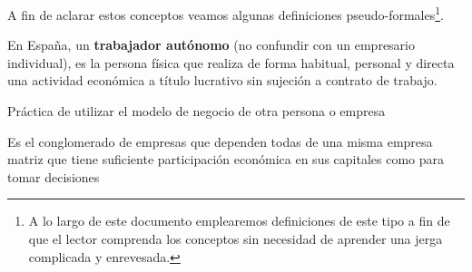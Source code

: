 \documentclass[nochap,palatino,shortheader]{apuntes}
\begin{document}
A fin de aclarar estos conceptos veamos algunas definiciones pseudo-formales\footnote{A lo largo de este documento emplearemos definiciones de este tipo a fin de que el lector comprenda los conceptos sin necesidad de aprender una jerga complicada y enrevesada.}.

\begin{defn}[Autónomo]
En España, un \textbf{trabajador autónomo} (no confundir con un empresario individual), es la persona física que realiza de forma habitual, personal y directa una actividad económica a título lucrativo sin sujeción a contrato de trabajo.
\end{defn}

\begin{defn}[Franquicia]
Práctica de utilizar el modelo de negocio de otra persona o empresa
\end{defn}

\begin{defn}
Es el conglomerado de empresas que dependen todas de una misma empresa matriz que tiene suficiente participación económica en sus capitales como para tomar decisiones
\end{defn}
\end{document}
